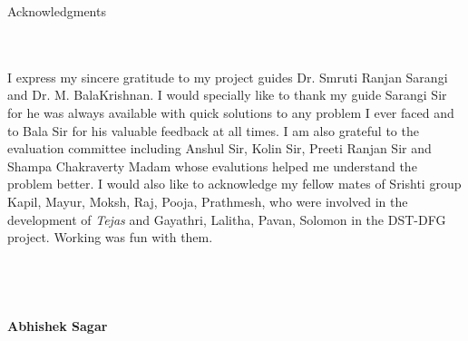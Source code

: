 \begin{center}
\LARGE{Acknowledgments} 
\end{center}
\ \\ \ \\
I express my sincere gratitude to my project guides Dr. Smruti Ranjan Sarangi and Dr. M. BalaKrishnan. I would specially like to thank my guide Sarangi Sir for he was always available with quick solutions to any problem I ever faced and to Bala Sir for his valuable feedback at all times. I am also grateful to the evaluation committee including Anshul Sir, Kolin Sir, Preeti Ranjan Sir and Shampa Chakraverty Madam whose evalutions helped me understand the problem better. 
I would also like to acknowledge my fellow mates of Srishti group Kapil, Mayur, Moksh, Raj, Pooja, Prathmesh, who were involved in the development of \emph{Tejas} and Gayathri, Lalitha, Pavan, Solomon in the DST-DFG project. Working was fun with them.
\\
\\
\\
\\
\\
{\bfseries Abhishek Sagar} \\
